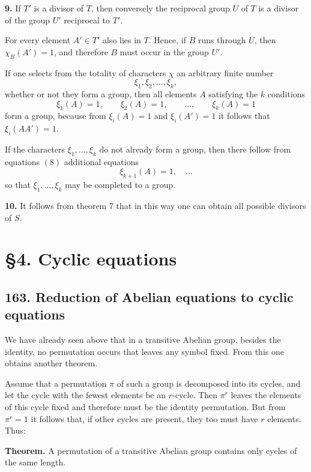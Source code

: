 \documentclass[11pt]{article}
\begin{document}
\medskip
\noindent\textbf{9.} If \(T'\) is a divisor of \(T\), then conversely the reciprocal group \(U\) of \(T\) is a divisor of the group \(U'\) reciprocal to \(T'\).

\medskip
For every element \(A'\in T'\) also lies in \(T\). Hence, if \(B\) runs through \(U\), then \(\chi_B(A')=1\), and therefore \(B\) must occur in the group \(U'\).

If one selects from the totality of characters \(\chi\) an arbitrary finite number
\[
\xi_1,\xi_2,\dots,\xi_k,
\]
whether or not they form a group, then all elements \(A\) satisfying the \(k\) conditions
\[
\xi_1(A)=1,\qquad
\xi_2(A)=1,\qquad
\dots,\qquad
\xi_k(A)=1
\tag{8}
\]
form a group, because from \(\xi_i(A)=1\) and \(\xi_i(A')=1\) it follows that \(\xi_i(AA')=1\).

If the characters \(\xi_1,\dots,\xi_k\) do not already form a group, then there follow from equations \((8)\) additional equations
\[
\xi_{k+1}(A)=1,\quad \dots
\]
so that \(\xi_1,\dots,\xi_k\) may be completed to a group.

\medskip
\noindent\textbf{10.} It follows from theorem 7 that in this way one can obtain all possible divisors of \(S\).

\medskip

\clearpage

\section*{\S 4. Cyclic equations}

\subsection*{163. Reduction of Abelian equations to cyclic equations}

We have already seen above that in a transitive Abelian group, besides the identity, no permutation occurs that leaves any symbol fixed. From this one obtains another theorem.

Assume that a permutation $\pi$ of such a group is decomposed into its cycles, and let the cycle with the fewest elements be an $r$-cycle. Then $\pi^r$ leaves the elements of this cycle fixed and therefore must be the identity permutation. But from $\pi^r = 1$ it follows that, if other cycles are present, they too must have $r$ elements. Thus:

\medskip
\noindent\textbf{Theorem.}
A permutation of a transitive Abelian group contains only cycles of the same length.
\end{document}
